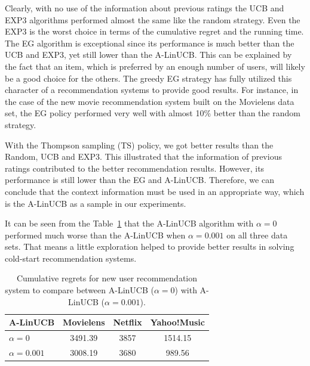 \documentclass[twoside,leqno,twocolumn]{article}
\begin{document}
Clearly, with no use of the information about previous ratings the UCB and EXP3 algorithms
performed almost the same like the random strategy. Even the EXP3 is the worst choice in terms of
the cumulative regret and the running time. The EG algorithm is exceptional since its performance
is much better than the UCB and EXP3, yet still lower than the A-LinUCB. This can be explained by
the fact that an item, which is preferred by an enough number of users, will likely be a good
choice for the others. The greedy EG strategy has fully utilized this character of a recommendation
systems to provide good results. For instance, in the case of the new movie recommendation system
built on the Movielens data set, the EG policy performed very well with almost 10\% better than the
random strategy.

With the Thompson sampling (TS) policy, we got better results than the Random, UCB and EXP3. This illustrated that the information of previous ratings contributed to the better recommendation results. However, its performance is still lower than the EG and A-LinUCB. Therefore, we can conclude that the context information must be used in an appropriate way, which is the A-LinUCB as a sample in our experiments. 

It can be seen from the Table~\ref{table:A-LinUCB(0)vsA-LinUCB(0.001)} that the A-LinUCB algorithm with $\alpha=0$ performed much worse than the A-LinUCB when $\alpha=0.001$ on all three data sets. That means a little exploration helped to provide better results in solving cold-start recommendation systems. 

\begin{table}
  \caption{Cumulative regrets for new user recommendation system to
    compare between A-LinUCB ($\alpha=0$) with A-LinUCB
    ($\alpha=0.001$).}
  \centering
  \begin{tabular}{|l|c|c|c|}
    \hline
    A-LinUCB & Movielens & Netflix & Yahoo!Music \\
    \hline
    $\alpha=0$ & 3491.39 & 3857 & 1514.15 \\
    \hline
    $\alpha=0.001$ & 3008.19 & 3680 & 989.56 \\
    \hline
  \end{tabular}
  \label{table:A-LinUCB(0)vsA-LinUCB(0.001)}
\end{table}
\end{document}
